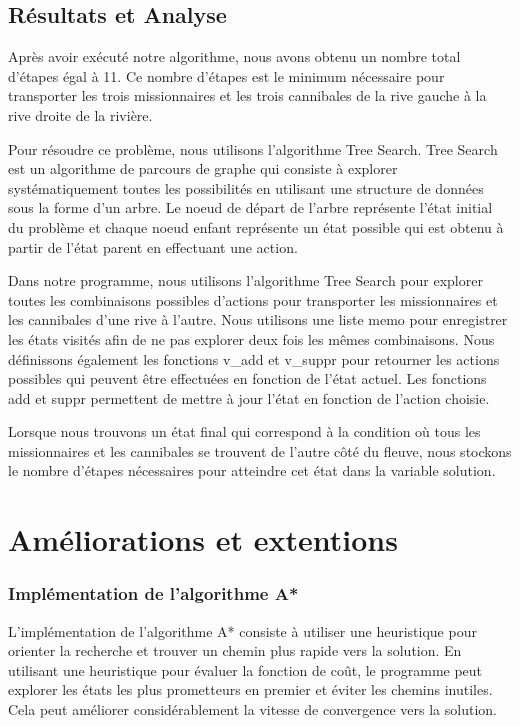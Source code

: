 \documentclass{article}
\begin{document}
\subsection{Résultats et Analyse}

\noindent  Après avoir exécuté notre algorithme, nous avons obtenu un nombre total d'étapes égal à 11. Ce nombre d'étapes est le minimum nécessaire pour transporter les trois missionnaires et les trois cannibales de la rive gauche à la rive droite de la rivière.

\noindent Pour résoudre ce problème, nous utilisons l'algorithme Tree Search. Tree Search est un algorithme de parcours de graphe qui consiste à explorer systématiquement toutes les possibilités en utilisant une structure de données sous la forme d'un arbre. Le noeud de départ de l'arbre représente l'état initial du problème et chaque noeud enfant représente un état possible qui est obtenu à partir de l'état parent en effectuant une action.

\noindent Dans notre programme, nous utilisons l'algorithme Tree Search pour explorer toutes les combinaisons possibles d'actions pour transporter les missionnaires et les cannibales d'une rive à l'autre. Nous utilisons une liste memo pour enregistrer les états visités afin de ne pas explorer deux fois les mêmes combinaisons.
Nous définissons également les fonctions v\_add et v\_suppr pour retourner les actions possibles qui peuvent être effectuées en fonction de l'état actuel. Les fonctions add et suppr permettent de mettre à jour l'état en fonction de l'action choisie.

\noindent Lorsque nous trouvons un état final qui correspond à la condition où tous les missionnaires et les cannibales se trouvent de l'autre côté du fleuve, nous stockons le nombre d'étapes nécessaires pour atteindre cet état dans la variable solution.


\noindent 


\section{Améliorations et extentions}

\subsubsection{Implémentation de l'algorithme A*}
 
L'implémentation de l'algorithme A* consiste à utiliser une heuristique pour orienter la recherche et trouver un chemin plus rapide vers la solution. En utilisant une heuristique pour évaluer la fonction de coût, le programme peut explorer les états les plus prometteurs en premier et éviter les chemins inutiles. Cela peut améliorer considérablement la vitesse de convergence vers la solution.
\end{document}
